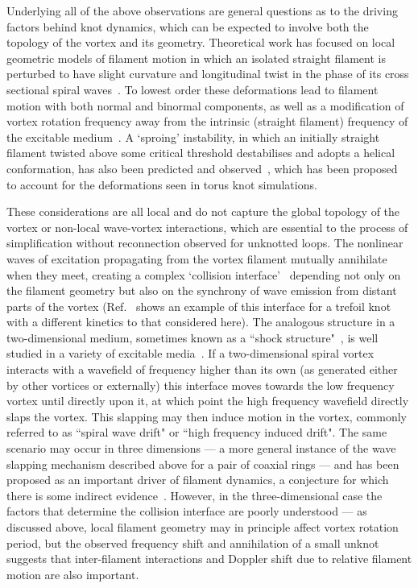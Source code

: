 Underlying all of the above observations are general questions as to the driving factors behind knot dynamics, which can be expected to involve both the topology of the vortex and its geometry. 
Theoretical work has focused on local geometric models of filament motion in which an isolated straight filament is perturbed to have slight curvature and longitudinal twist in the phase of its cross sectional spiral waves~\citep{Keener1988,Keener1992,Henry2002,Biktashev1994,Echebarria2006,Dierckx2010}. To lowest order these deformations lead to filament motion with both normal and binormal components, as well as a modification of vortex rotation frequency away from the intrinsic (straight filament) frequency of the excitable medium~\citep{Keener1988,Biktashev1994,Dierckx2010}. A `sproing' instability, in which an initially straight filament twisted above some critical threshold destabilises and adopts a helical conformation, has also been predicted and observed~\citep{Keener1988,Henze1993,Henry2002,Echebarria2006, Dierckx2010}, which has been proposed~\citep{Maucher2017} to account for the deformations seen in torus knot simulations. 

These considerations are all local and do not capture the global topology of the vortex or non-local wave-vortex interactions, which are essential to the process of simplification without reconnection observed for unknotted loops. The nonlinear waves of excitation propagating from the vortex filament mutually annihilate when they meet, creating a complex `collision interface'~\citep{Winfree1990, Henze1991, Henze1993, WinfreeChapter, Sutcliffe2003} depending not only on the filament geometry but also on the synchrony of wave emission from distant parts of the vortex (Ref.~\citep{Henze1991} shows an example of this interface for a trefoil knot with a different kinetics to that considered here). The analogous structure in a two-dimensional medium, sometimes known as a ``shock structure"~\citep{Kopell1973}, is well studied in a variety of excitable media~\citep{Krinsky1983,Ermakova1986,Vinson1998,Gottwald2001,Agladze2007,Steinbock2011}. If a two-dimensional spiral vortex interacts with a wavefield of frequency higher than its own (as generated either by other vortices or externally) this interface moves towards the low frequency vortex until directly upon it, at which point the high frequency wavefield directly slaps the vortex. This slapping may then induce motion in the vortex, commonly referred to as ``spiral wave drift" or ``high frequency induced drift". The same scenario may occur in three dimensions --- a more general instance of the wave slapping mechanism described above for a pair of coaxial rings --- and has been proposed as an important driver of filament dynamics, a conjecture for which there is some indirect evidence~\citep{WinfreeChapter, Sutcliffe2003,Maucher2019}. However, in the three-dimensional case the factors that determine the collision interface are poorly understood --- as discussed above, local filament geometry may in principle affect vortex rotation period, but the observed frequency shift and annihilation of a small unknot suggests that inter-filament interactions and Doppler shift due to relative filament motion are also important.

